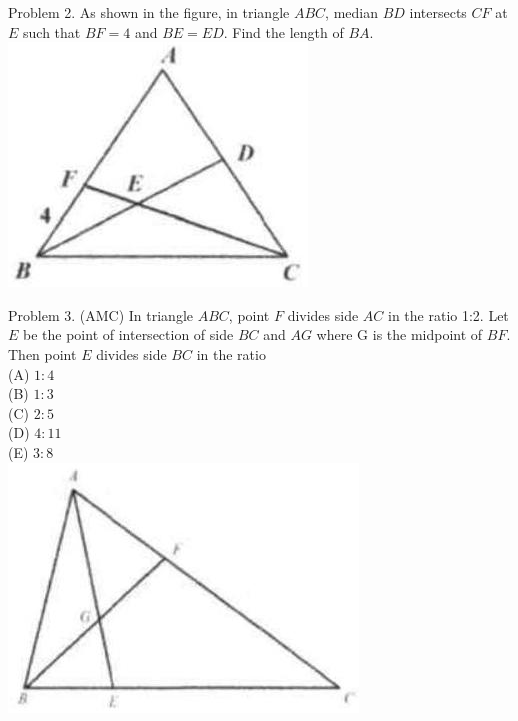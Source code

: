 \documentclass[10pt]{article}
\begin{document}
Problem 2. As shown in the figure, in triangle \(A B C\), median \(B D\) intersects \(C F\) at \(E\) such that \(B F=4\) and \(B E=E D\). Find the length of \(B A\).\\
\includegraphics[max width=\textwidth, center]{2025_04_17_97bc1f7e44d93c271a88g-126(2)}

Problem 3. (AMC) In triangle \(A B C\), point \(F\) divides side \(A C\) in the ratio 1:2. Let \(E\) be the point of intersection of side \(B C\) and \(A G\) where G is the midpoint of \(B F\). Then point \(E\) divides side \(B C\) in the ratio\\
(A) \(1: 4\)\\
(B) \(1: 3\)\\
(C) \(2: 5\)\\
(D) \(4: 11\)\\
(E) \(3: 8\)\\
\includegraphics[max width=\textwidth, center]{2025_04_17_97bc1f7e44d93c271a88g-126}
\end{document}
